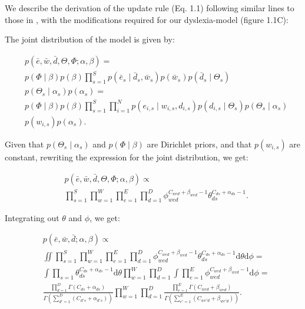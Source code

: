 We describe the derivation of the update rule (Eq. 1.1) following similar lines to those in \citet{gs04}, with the modifications required for our dyslexia-model (figure 1.1C):

The joint distribution of the model is given by:

\begin{equation*}
\begin{split}
&p(\bar{e},\bar{w},\bar{d},\Theta,\Phi;\alpha,\beta) = \\
&p(\Phi\mid\beta)p(\beta)\prod_{s = 1}^S p(\bar{e}_s\mid\bar{d}_s, \bar{w}_s) p(\bar{w}_s)p(\bar{d}_s\mid\Theta_s)\\ &p(\Theta_s\mid\alpha_s)p(\alpha_s) = \\
&p(\Phi\mid\beta) p(\beta) \prod_{s = 1}^S \prod_{i=1}^N p(e_{i, s} \mid w_{i, s}, d_{i, s}) p(d_{i, s}\mid\Theta_s) p(\Theta_s\mid\alpha_s)\\
&p(w_{i, s}) p(\alpha_s).
\end{split}
\end{equation*}

Given that $p(\Theta_s\mid\alpha_s)$ and $p(\Phi\mid\beta)$ are Dirichlet priors, and that $p(w_{i, s})$ are constant, rewriting the expression for the joint distribution, we get:

\begin{equation*}
\begin{split}
&p(\bar{e}, \bar{w}, \bar{d}, \Theta, \Phi; \alpha, \beta) \propto \\
&\prod_{s=1}^S \prod_{w=1}^W \prod_{e=1}^E \prod_{d = 1}^D \phi_{wed}^{C_{wed} + \beta_{wed} - 1} \theta_{ds}^{C_{ds} + \alpha_{ds} - 1}.
\end{split}
\end{equation*}

Integrating out $\theta$ and $\phi$, we get:

\begin{equation*}
\begin{split}
&p(\bar{e},\bar{w},\bar{d};\alpha,\beta) \propto \\
&\iint \prod_{s=1}^S \prod_{w=1}^W \prod_{e=1}^E \prod_{d = 1}^D  \phi_{wed}^{C_{wed} + \beta_{wed} - 1} \theta_{ds}^{C_{ds} + \alpha_{ds} - 1} \mathrm{d}\theta \mathrm{d}\phi = \\
&\int \prod_{s=1} \theta_{ds}^{C_{ds} + \alpha_{ds} - 1} \mathrm{d}\theta \prod_{w=1}^W \prod_{d = 1}^D \int\prod_{e=1}^E \phi_{wed}^{C_{wed} + \beta_{wed} - 1} \mathrm{d}\phi = \\
&\frac{\prod_{d = 1}^D\Gamma(C_{ds} + \alpha_{ds})}{\Gamma(\sum_{d' = 1}^D (C_{d's} + \alpha_{d's}))}\prod_{w=1}^W\prod_{d = 1}^D \frac{\prod_{e = 1}^E\Gamma(C_{wed} + \beta_{wed})}{\Gamma(\sum_{e' = 1}^E (C_{we'd} + \beta_{we'd}))}.
\end{split}
\end{equation*}

